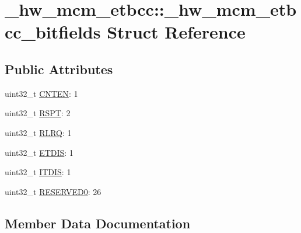 \hypertarget{struct__hw__mcm__etbcc_1_1__hw__mcm__etbcc__bitfields}{}\section{\+\_\+hw\+\_\+mcm\+\_\+etbcc\+:\+:\+\_\+hw\+\_\+mcm\+\_\+etbcc\+\_\+bitfields Struct Reference}
\label{struct__hw__mcm__etbcc_1_1__hw__mcm__etbcc__bitfields}
\subsection*{Public Attributes}
\begin{DoxyCompactItemize}
\item 
uint32\+\_\+t \hyperlink{struct__hw__mcm__etbcc_1_1__hw__mcm__etbcc__bitfields_a41aed3adb081d7b71065a2e1d43f0152}{C\+N\+T\+EN}\+: 1
\item 
uint32\+\_\+t \hyperlink{struct__hw__mcm__etbcc_1_1__hw__mcm__etbcc__bitfields_a773bcdb976b96bd79f2658cb55588fc6}{R\+S\+PT}\+: 2
\item 
uint32\+\_\+t \hyperlink{struct__hw__mcm__etbcc_1_1__hw__mcm__etbcc__bitfields_a4ed1b7ff377a585ac0be9db1d1b95fb7}{R\+L\+RQ}\+: 1
\item 
uint32\+\_\+t \hyperlink{struct__hw__mcm__etbcc_1_1__hw__mcm__etbcc__bitfields_a0e5ce95d0182e9aa27e69f0e5b3c8b2f}{E\+T\+D\+IS}\+: 1
\item 
uint32\+\_\+t \hyperlink{struct__hw__mcm__etbcc_1_1__hw__mcm__etbcc__bitfields_a35de83b974bffb7cd579274f281bc34e}{I\+T\+D\+IS}\+: 1
\item 
uint32\+\_\+t \hyperlink{struct__hw__mcm__etbcc_1_1__hw__mcm__etbcc__bitfields_af8390b3043efb76483ca3f0a59f92e0f}{R\+E\+S\+E\+R\+V\+E\+D0}\+: 26
\end{DoxyCompactItemize}


\subsection{Member Data Documentation}
